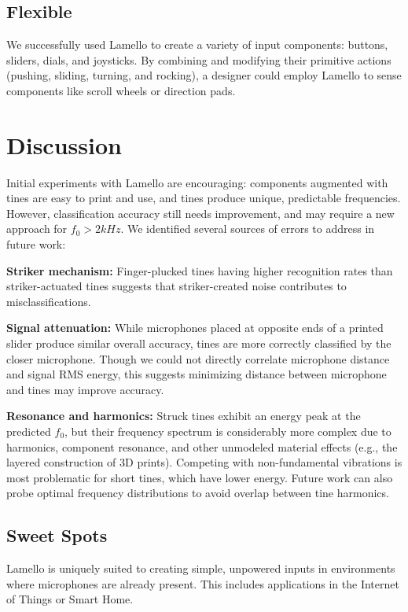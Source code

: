     \subsection{Flexible}
    We successfully used Lamello to create a variety of input components: buttons, sliders, dials, and joysticks. By combining and modifying their primitive actions (pushing, sliding, turning, and rocking), a designer could employ Lamello to sense components like scroll wheels or direction pads.

\section{Discussion}

Initial experiments with Lamello are encouraging: components augmented with tines are easy to print and use, and tines produce unique, predictable frequencies. However, classification accuracy still needs improvement, and may require a new approach for $f_0>2kHz$. We identified several sources of errors to address in future work:

\textbf{Striker mechanism:} Finger-plucked tines having higher recognition rates than striker-actuated tines suggests that striker-created noise contributes to misclassifications.

\textbf{Signal attenuation:} While microphones placed at opposite ends of a printed slider produce similar overall accuracy, tines are more correctly classified by the closer microphone.  Though we could not directly correlate microphone distance and signal RMS energy, this suggests minimizing distance between microphone and tines may improve accuracy.

\textbf{Resonance and harmonics:} Struck tines exhibit an energy peak at the predicted $f_0$, but their frequency spectrum is considerably more complex due to harmonics, component resonance, and other unmodeled material effects (e.g., the layered construction of 3D prints). Competing with non-fundamental vibrations is most problematic for short tines, which have lower energy.  Future work can also probe optimal frequency distributions to avoid overlap between tine harmonics.

    \subsection{Sweet Spots}

    Lamello is uniquely suited to creating simple, unpowered inputs in environments where microphones are already present. This includes applications in the Internet of Things or Smart Home.
    

